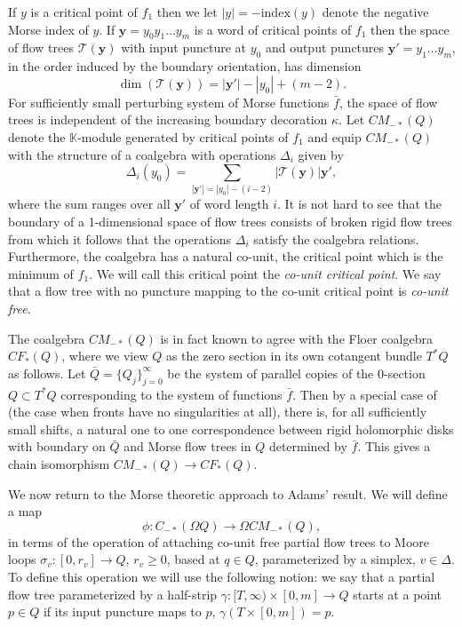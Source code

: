 \documentclass{gtpart}
\begin{document}
If $y$ is a critical point of $f_{1}$ then we let $|y|=-\mathrm{index}(y)$ denote the negative Morse index of $y$.
If $\mathbf{y}=y_{0}y_{1}\dots y_{m}$ is a word of critical points of $f_{1}$ then the space of flow trees $\mathcal{T}(\mathbf{y})$ with input puncture at $y_{0}$ and output punctures $\mathbf{y}'=y_{1}\dots y_{m}$, in the order induced by the boundary orientation, has dimension
\[ 
\dim(\mathcal{T}(\mathbf{y}))= |\mathbf{y}'| - |y_{0}| + (m-2).
\]
For sufficiently small perturbing system of Morse functions $\bar f$, the space of flow trees is
independent of the increasing boundary decoration $\kappa$. Let $CM_{-\ast}(Q)$ denote the
$\mathbb{K}$-module generated by critical points of $f_{1}$ and equip $CM_{-\ast}(Q)$ with the structure of a coalgebra with operations $\Delta_{i}$ given by
\[ 
\Delta_{i}(y_{0})=\sum_{|\mathbf{y}'|=|y_{0}|-(i-2)}|\mathcal{T}(\mathbf{y})|\mathbf{y}',
\] 
where the sum ranges over all $\mathbf{y}'$ of word length $i$. It is not hard to see that the boundary of a 1-dimensional space of flow trees consists of broken rigid flow trees from which it follows that the operations $\Delta_{i}$ satisfy the coalgebra relations. Furthermore, the coalgebra has a natural co-unit, the critical point which is the minimum of $f_{1}$. We will call this critical point the \emph{co-unit critical point}. We say that a flow tree with no puncture mapping to the co-unit critical point is \emph{co-unit free}.  

The coalgebra $CM_{-\ast}(Q)$ is in fact known to agree with the Floer coalgebra $CF_{\ast}(Q)$,
where we view $Q$ as the zero section in its own cotangent bundle $T^{\ast}Q$ as follows. Let $\bar Q=\{Q_{j}\}_{j=0}^{\infty}$ be the system of parallel copies of the
$0$-section $Q \subset T^{\ast}Q$ corresponding to the system of functions $\bar f$.  
Then by a special case of \cite[Theorem 1.1]{E} (the case when fronts have no singularities at all),
there is, for all sufficiently small shifts, a natural one to one correspondence between rigid
holomorphic disks with boundary on $\bar Q$ and Morse flow trees in $Q$ determined by $\bar f$. This
gives a chain isomorphism $CM_{-\ast}(Q)\to CF_{\ast}(Q)$. 

We now return to the Morse theoretic approach to Adams' result. We will define a map
\[
\phi\colon C_{-\ast}(\Omega Q)\to \Omega CM_{-\ast}(Q),
\]  
in terms of the operation of attaching co-unit free partial flow trees to Moore loops 
$\sigma_{v}\colon [0,r_v]\to Q$, $r_{v}\ge 0$, based at $q\in Q$, parameterized by a simplex, $v\in\Delta$. To define this operation we will use the following notion: we say that a partial flow tree parameterized by a half-strip $\gamma\colon [T,\infty)\times[0,m]\to Q$ starts at a point $p\in Q$ if its input puncture maps to $p$, $\gamma(T\times[0,m])=p$.
 
\end{document}
